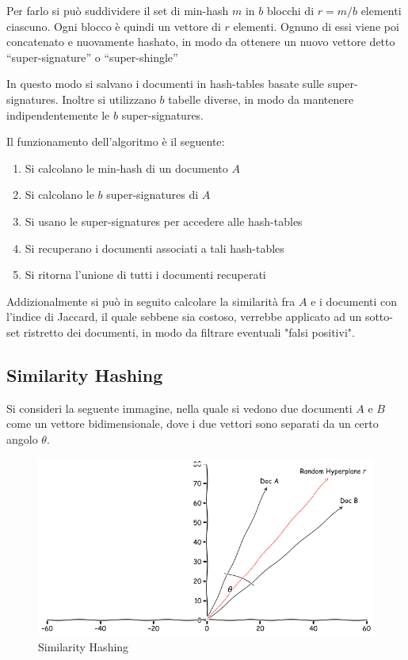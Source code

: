 		Per farlo si può suddividere il set di min-hash $m$ in $b$ blocchi di $r=m/b$ elementi ciascuno. Ogni blocco è quindi un vettore di $r$ elementi. Ognuno di essi viene poi concatenato e nuovamente hashato, in modo da ottenere un nuovo vettore detto ``super-signature'' o ``super-shingle''

		In questo modo si salvano i documenti in hash-tables basate sulle super-signatures. Inoltre si utilizzano $b$ tabelle diverse, in modo da mantenere indipendentemente le $b$ super-signatures.

		Il funzionamento dell'algoritmo è il seguente:	
		\begin{enumerate}
			\item Si calcolano le min-hash di un documento $A$
			\item Si calcolano le $b$ super-signatures di $A$
			\item Si usano le super-signatures per accedere alle hash-tables
			\item Si recuperano i documenti associati a tali hash-tables
			\item Si ritorna l'unione di tutti i documenti recuperati
		\end{enumerate}

		Addizionalmente si può in seguito calcolare la similarità fra $A$ e i documenti con l'indice di Jaccard, il quale sebbene sia costoso, verrebbe applicato ad un sotto-set ristretto dei documenti, in modo da filtrare eventuali "falsi positivi".

		\clearpage

		\subsection{Similarity Hashing}
			Si consideri la seguente immagine, nella quale si vedono due documenti $A$ e $B$ come un vettore bidimensionale, dove i due vettori sono separati da un certo angolo $\theta$.

			\begin{figure}[h]
				\centering
				\includegraphics[width=1\textwidth]{images/sim-hash.png}
				\caption{Similarity Hashing}
			\end{figure}

